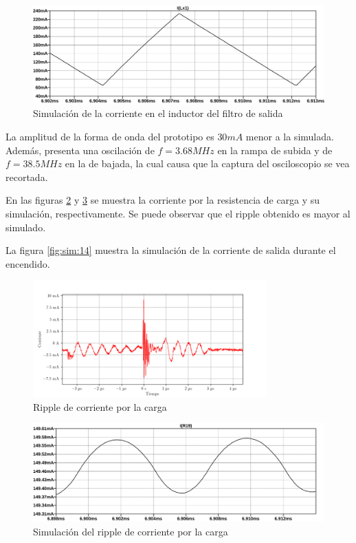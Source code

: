 \begin{figure}[H]
    \centering
    \includegraphics[width=\textwidth]{images/sim/13.pdf}
    \caption{Simulación de la corriente en el inductor del filtro de salida}
    \label{fig:sim:13}
\end{figure}

La amplitud de la forma de onda del prototipo es $30mA$ menor a la simulada. 
Además, presenta una oscilación de $f=3.68MHz$ en la rampa de subida y de $f=38.5MHz$ en la de bajada, la cual causa que la captura del osciloscopio se vea recortada. 

En las figuras \ref{fig:osc:67} y \ref{fig:sim:14ripple} se muestra la corriente por la resistencia de carga y su simulación, respectivamente. Se puede observar que el ripple obtenido es mayor al simulado.

La figura \ref{fig:sim:14} muestra la simulación de la corriente de salida durante el encendido.


\begin{figure}[H]
    \centering
    \includegraphics[width=0.8\textwidth]{images/capturas-osciloscopio/17-11-2022/67.png}
    \caption{Ripple de corriente por la carga}
    \label{fig:osc:67}
\end{figure}

\begin{figure}[H]
    \centering
    \includegraphics[width=\textwidth]{images/sim/14-ripple.pdf}
    \caption{Simulación del ripple de corriente por la carga}
    \label{fig:sim:14ripple}
\end{figure}

